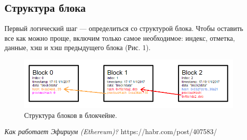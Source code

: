 \documentclass{article}
\begin{document}
\subsection{Структура блока}


Первый логический шаг — определиться со структурой блока. Чтобы оставить все как можно проще, включим только самое необходимое: индекс, отметка, данные, хэш и хэш предыдущего блока (Рис. 1).


\begin{figure}
	\centering
	\includegraphics[scale=0.4]{blockchain_scheme}
	\caption{Структура блоков в блокчейне.}
	\label{fig:blockchain_scheme}
\end{figure}



\begin{thebibliography}{9}

	  \emph{Как работает Эфириум (Ethereum)?}
	  https://habr.com/post/407583/

\end{thebibliography}
\end{document}
